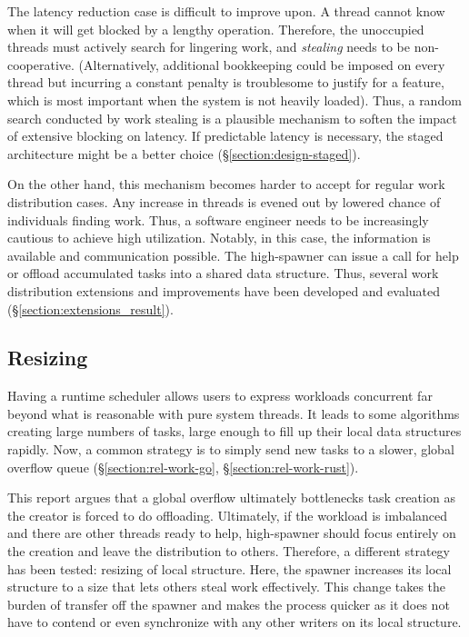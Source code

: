 \documentclass[12pt,a4paper,twoside]{report}
\begin{document}
The latency reduction case is difficult to improve upon. A thread cannot know when it will get blocked by a lengthy operation. Therefore, the unoccupied threads must actively search for lingering work, and \textit{stealing} needs to be non-cooperative. (Alternatively, additional bookkeeping could be imposed on every thread but incurring a constant penalty is troublesome to justify for a feature, which is most important when the system is not heavily loaded). Thus, a random search conducted by work stealing is a plausible mechanism to soften the impact of extensive blocking on latency. If predictable latency is necessary, the staged architecture might be a better choice (\S\ref{section:design-staged}).

On the other hand, this mechanism becomes harder to accept for regular work distribution cases. Any increase in threads is evened out by lowered chance of individuals finding work. Thus, a software engineer needs to be increasingly cautious to achieve high utilization. Notably, in this case, the information is available and communication possible. The high-spawner can issue a call for help or offload accumulated tasks into a shared data structure. Thus, several work distribution extensions and improvements have been developed and evaluated (\S\ref{section:extensions_result}).

\subsection{Resizing}
\label{section:resizing}

Having a runtime scheduler allows users to express workloads concurrent far beyond what is reasonable with pure system threads. It leads to some algorithms creating large numbers of tasks, large enough to fill up their local data structures rapidly. Now, a common strategy is to simply send new tasks to a slower, global overflow queue (\S\ref{section:rel-work-go}, \S\ref{section:rel-work-rust}).

This report argues that a global overflow ultimately bottlenecks task creation as the creator is forced to do offloading. Ultimately, if the workload is imbalanced and there are other threads ready to help, high-spawner should focus entirely on the creation and leave the distribution to others. Therefore, a different strategy has been tested: resizing of local structure. Here, the spawner increases its local structure to a size that lets others steal work effectively. This change takes the burden of transfer off the spawner and makes the process quicker as it does not have to contend or even synchronize with any other writers on its local structure. 
\end{document}
